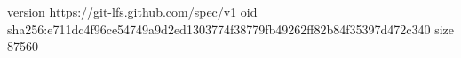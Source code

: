 version https://git-lfs.github.com/spec/v1
oid sha256:e711dc4f96ce54749a9d2ed1303774f38779fb49262ff82b84f35397d472c340
size 87560
